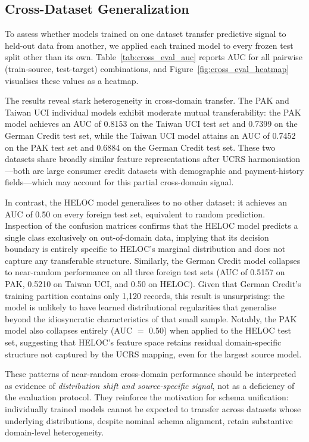 \documentclass[onecolumn]{IEEEtai}
\begin{document}
\subsection{Cross-Dataset Generalization}\vspace{-2pt}

To assess whether models trained on one dataset transfer predictive signal to held-out data from another, we applied each trained model to every frozen test split other than its own. Table~\ref{tab:cross_eval_auc} reports AUC for all pairwise (train-source, test-target) combinations, and Figure~\ref{fig:cross_eval_heatmap} visualises these values as a heatmap.

The results reveal stark heterogeneity in cross-domain transfer. The PAK and Taiwan UCI individual models exhibit moderate mutual transferability: the PAK model achieves an AUC of 0.8153 on the Taiwan UCI test set and 0.7399 on the German Credit test set, while the Taiwan UCI model attains an AUC of 0.7452 on the PAK test set and 0.6884 on the German Credit test set. These two datasets share broadly similar feature representations after UCRS harmonisation---both are large consumer credit datasets with demographic and payment-history fields---which may account for this partial cross-domain signal.

In contrast, the HELOC model generalises to no other dataset: it achieves an AUC of 0.50 on every foreign test set, equivalent to random prediction. Inspection of the confusion matrices confirms that the HELOC model predicts a single class exclusively on out-of-domain data, implying that its decision boundary is entirely specific to HELOC's marginal distribution and does not capture any transferable structure. Similarly, the German Credit model collapses to near-random performance on all three foreign test sets (AUC of 0.5157 on PAK, 0.5210 on Taiwan UCI, and 0.50 on HELOC). Given that German Credit's training partition contains only 1{,}120 records, this result is unsurprising: the model is unlikely to have learned distributional regularities that generalise beyond the idiosyncratic characteristics of that small sample. Notably, the PAK model also collapses entirely (AUC $=$ 0.50) when applied to the HELOC test set, suggesting that HELOC's feature space retains residual domain-specific structure not captured by the UCRS mapping, even for the largest source model.

These patterns of near-random cross-domain performance should be interpreted as evidence of \emph{distribution shift and source-specific signal}, not as a deficiency of the evaluation protocol. They reinforce the motivation for schema unification: individually trained models cannot be expected to transfer across datasets whose underlying distributions, despite nominal schema alignment, retain substantive domain-level heterogeneity.
\end{document}
